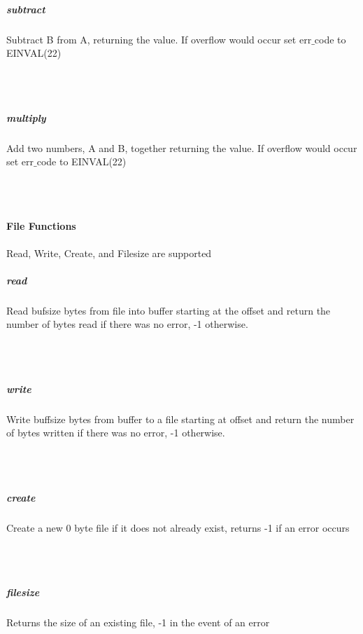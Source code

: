 \documentclass[11pt,letterpaper]{article}
\begin{document}
\begin{minipage}{\linewidth}
\subparagraph*{subtract} Subtract B from A, returning the value. If overflow would occur set err$\_$code to EINVAL(22)

\end{minipage}\\\\

\begin{minipage}{\linewidth}
\subparagraph*{multiply}Add two numbers, A and B, together returning the value. If overflow would occur set err$\_$code to EINVAL(22)

\end{minipage}\\\\

\paragraph*{File Functions}Read, Write, Create, and Filesize are supported\par

\begin{minipage}{\linewidth}
\subparagraph*{read} Read bufsize bytes from file into buffer starting at the offset and return the number of bytes read if there was no error, -1 otherwise.

\end{minipage}\\\\

\begin{minipage}{\linewidth}
\subparagraph*{write} Write buffsize bytes from buffer to a file starting at offset and return the number of bytes written if there was no error, -1 otherwise.

\end{minipage}\\\\

\begin{minipage}{\linewidth}
\subparagraph*{create}Create a new 0 byte file if it does not already exist, returns -1 if an error occurs

\end{minipage}\\\\

\begin{minipage}{\linewidth}
\subparagraph*{filesize} Returns the size of an existing file, -1 in the event of an error

\end{minipage}\\\\
\end{document}
